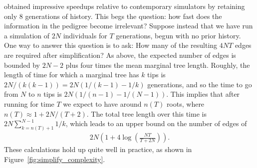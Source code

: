 \documentclass{article}
\begin{document}
\citet{padhukasahasram2008exploring} obtained impressive speedups relative to contemporary simulators
by retaining only 8 generations of history.
This begs the question: how fast does the information in the pedigree become irrelevant?
Suppose instead that we have run a simulation of $2N$ individuals for $T$ generations,
begun with no prior history.
One way to answer this question is to ask:
How many of the resulting $4NT$ edges are required after simplification?
As above, the expected number of edges is bounded by $2N-2$ plus four times the mean marginal tree length.
Roughly, the length of time for which a marginal tree has $k$ tips is
$2N/(k(k-1)) = 2N(1/(k-1) - 1/k)$ generations,
and so the time to go from $N$ to $n$ tips is $2N(1/(n-1) - 1/(N-1))$.
This implies that after running for time $T$ we expect to
have around $n(T)$ roots, where $n(T) \approx 1 + 2N/(T+2)$.
The total tree length over this time is
$2 N \sum_{k=n(T)+1}^{N-1} 1/k$, which
leads to an upper bound on the number of edges of
\begin{align}
    \label{eqn:edge_bound}
    2 N \left( 1 + 4 \log\left( \frac{NT}{T + 2 N} \right)\right) .
\end{align}
These calculations hold up quite well in practice,
as shown in Figure~\ref{fig:simplify_complexity}.
\end{document}
